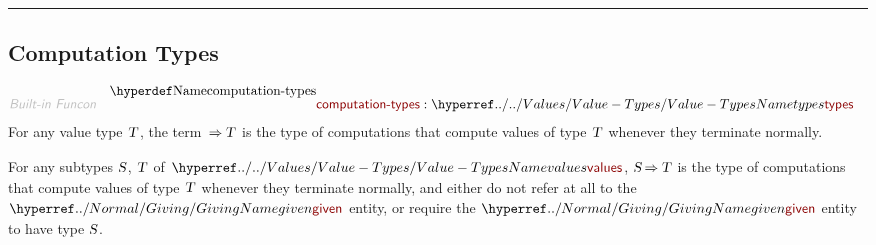 

\begin{center}
\rule{3in}{0.4pt}
\end{center}

\subsection{Computation Types}\hypertarget{computation-types}{}\label{computation-types}

\begin{align*}
  \KEY{Built-in Funcon} \quad
  & \NAMEDECL{computation-types} 
    : \NAMEHYPER{../../Values}{Value-Types}{types} 
\end{align*}
For any value type $\SHADE{\VAR{T}}$, the term $\SHADE{ \TO \VAR{T}}$ is the type of computations that
  compute values of type $\SHADE{\VAR{T}}$ whenever they terminate normally.

For any subtypes $\SHADE{\VAR{S}}$, $\SHADE{\VAR{T}}$ of $\SHADE{\NAMEHYPER{../../Values}{Value-Types}{values}}$, $\SHADE{\VAR{S} \TO \VAR{T}}$ is the type of computations
  that compute values of type $\SHADE{\VAR{T}}$ whenever they terminate normally, and
  either do not refer at all to the $\SHADE{\NAMEHYPER{../Normal}{Giving}{given}}$ entity, or require the $\SHADE{\NAMEHYPER{../Normal}{Giving}{given}}$
  entity to have type $\SHADE{\VAR{S}}$.



